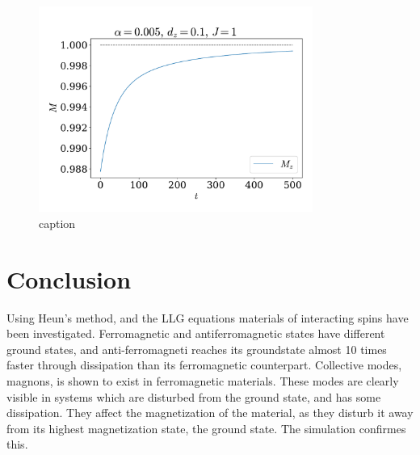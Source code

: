 \documentclass{article}
\begin{document}
    \begin{figure}
        \centering
        \includegraphics[width=0.8\textwidth]{../plots/mag.pdf}
        \caption{caption}
        \label{mag}
    \end{figure}

    \section*{Conclusion}
    Using Heun's method, and the LLG equations materials of interacting spins have been investigated. Ferromagnetic and antiferromagnetic states have different ground states, and anti-ferromagneti reaches its groundstate almost 10 times faster through dissipation than its ferromagnetic counterpart. Collective modes, magnons, is shown to exist in ferromagnetic materials. These modes are clearly visible in systems which are disturbed from the ground state, and has some dissipation. They affect the magnetization of the material, as they disturb it away from its highest magnetization state, the ground state. The simulation confirmes this.

    
    
\end{document}
